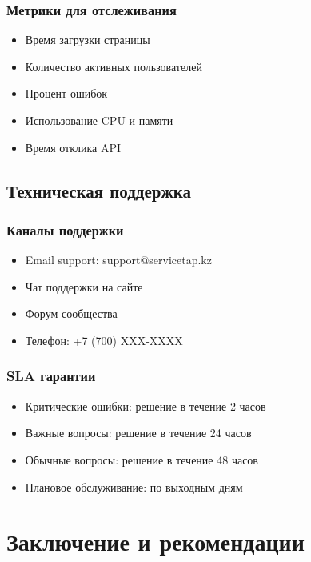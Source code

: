 \documentclass[12pt,a4paper]{report}
\begin{document}
\subsection{Метрики для отслеживания}
\begin{itemize}
    \item Время загрузки страницы
    \item Количество активных пользователей
    \item Процент ошибок
    \item Использование CPU и памяти
    \item Время отклика API
\end{itemize}

\section{Техническая поддержка}

\subsection{Каналы поддержки}
\begin{itemize}
    \item Email support: support@servicetap.kz
    \item Чат поддержки на сайте
    \item Форум сообщества
    \item Телефон: +7 (700) XXX-XXXX
\end{itemize}

\subsection{SLA гарантии}
\begin{itemize}
    \item Критические ошибки: решение в течение 2 часов
    \item Важные вопросы: решение в течение 24 часов
    \item Обычные вопросы: решение в течение 48 часов
    \item Плановое обслуживание: по выходным дням
\end{itemize}

\newpage

\chapter{Заключение и рекомендации}
\end{document}
